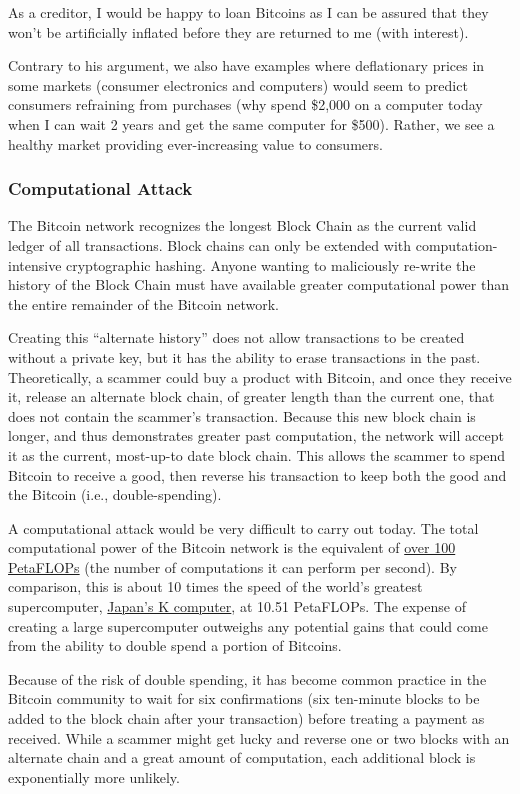 \documentclass[12pt,twocolumn]{article}
\begin{document}
As a creditor, I would be happy to loan Bitcoins as I can be assured
that they won't be artificially inflated before they are returned to me
(with interest).

Contrary to his argument, we also have examples where deflationary
prices in some markets (consumer electronics and computers) would seem
to predict consumers refraining from purchases (why spend \$2,000 on a
computer today when I can wait 2 years and get the same computer for
\$500). Rather, we see a healthy market providing ever-increasing value
to consumers.

\subsubsection{Computational Attack}

The Bitcoin network recognizes the longest Block Chain as the current
valid ledger of all transactions. Block chains can only be extended with
computation-intensive cryptographic hashing. Anyone wanting to
maliciously re-write the history of the Block Chain must have available
greater computational power than the entire remainder of the Bitcoin
network.

Creating this ``alternate history'' does not allow transactions to be
created without a private key, but it has the ability to erase
transactions in the past. Theoretically, a scammer could buy a product
with Bitcoin, and once they receive it, release an alternate block
chain, of greater length than the current one, that does not contain the
scammer's transaction. Because this new block chain is longer, and thus
demonstrates greater past computation, the network will accept it as the
current, most-up-to date block chain. This allows the scammer to spend
Bitcoin to receive a good, then reverse his transaction to keep both the
good and the Bitcoin (i.e., double-spending).

A computational attack would be very difficult to carry out today. The
total computational power of the Bitcoin network is the equivalent of
\href{http://www.bitcoinwatch.com/}{over 100 PetaFLOPs} (the number of
computations it can perform per second). By comparison, this is about 10
times the speed of the world's greatest supercomputer,
\href{http://www.top500.org/lists/2011/11/press-release}{Japan's K
computer}, at 10.51 PetaFLOPs. The expense of creating a large
supercomputer outweighs any potential gains that could come from the
ability to double spend a portion of Bitcoins.

Because of the risk of double spending, it has become common practice in
the Bitcoin community to wait for six confirmations (six ten-minute
blocks to be added to the block chain after your transaction) before
treating a payment as received. While a scammer might get lucky and
reverse one or two blocks with an alternate chain and a great amount of
computation, each additional block is exponentially more unlikely.
\end{document}
